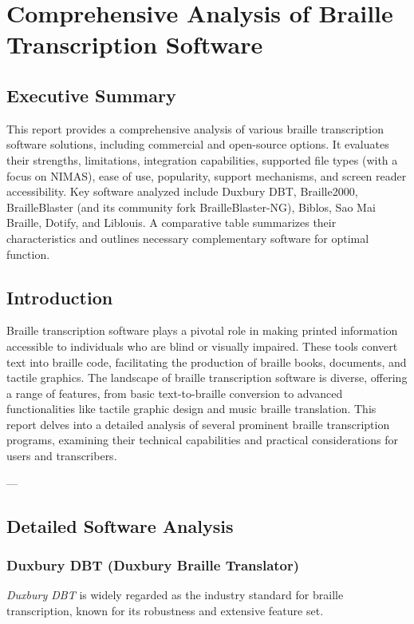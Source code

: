 \chapter{Comprehensive Analysis of Braille Transcription Software}
\label{chap:braille-transcription}

\section{Executive Summary}
\label{sec:braille-executive-summary}
This report provides a comprehensive analysis of various braille transcription software solutions, including commercial and open-source options. It evaluates their strengths, limitations, integration capabilities, supported file types (with a focus on NIMAS), ease of use, popularity, support mechanisms, and screen reader accessibility. Key software analyzed include Duxbury DBT, Braille2000, BrailleBlaster (and its community fork BrailleBlaster-NG), Biblos, Sao Mai Braille, Dotify, and Liblouis. A comparative table summarizes their characteristics and outlines necessary complementary software for optimal function.


\section{Introduction}
\label{sec:braille-intro}
Braille transcription software plays a pivotal role in making printed information accessible to individuals who are blind or visually impaired. These tools convert text into braille code, facilitating the production of braille books, documents, and tactile graphics. The landscape of braille transcription software is diverse, offering a range of features, from basic text-to-braille conversion to advanced functionalities like tactile graphic design and music braille translation. This report delves into a detailed analysis of several prominent braille transcription programs, examining their technical capabilities and practical considerations for users and transcribers.

---

\section{Detailed Software Analysis}
\label{sec:braille-detailed-analysis}

\subsection{Duxbury DBT (Duxbury Braille Translator)}
\emph{Duxbury DBT} is widely regarded as the industry standard for braille transcription, known for its robustness and extensive feature set.

